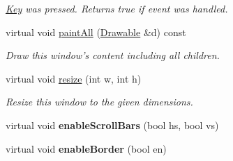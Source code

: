 \begin{DoxyCompactItemize}
\begin{DoxyCompactList}\small\item\em \hyperlink{classGUI_1_1Key}{Key} was pressed. Returns true if event was handled. \end{DoxyCompactList}\item 
\hypertarget{classGUI_1_1WindowInWindow_a997195eb95899394daa7c8806dfa6cf7}{virtual void \hyperlink{classGUI_1_1WindowInWindow_a997195eb95899394daa7c8806dfa6cf7}{paint\-All} (\hyperlink{classGUI_1_1Drawable}{Drawable} \&d) const }\label{classGUI_1_1WindowInWindow_a997195eb95899394daa7c8806dfa6cf7}

\begin{DoxyCompactList}\small\item\em Draw this window's content including all children. \end{DoxyCompactList}\item 
virtual void \hyperlink{classGUI_1_1WindowInWindow_a6ee682fe17ece1500d4b150b627efe48}{resize} (int w, int h)
\begin{DoxyCompactList}\small\item\em Resize this window to the given dimensions. \end{DoxyCompactList}\item 
\hypertarget{classGUI_1_1WindowInWindow_ae577d55445b2570da3755ae6912c66e0}{virtual void {\bfseries enable\-Scroll\-Bars} (bool hs, bool vs)}\label{classGUI_1_1WindowInWindow_ae577d55445b2570da3755ae6912c66e0}

\item 
\hypertarget{classGUI_1_1WindowInWindow_ae001aea9ade5258b7ac0d4df8c5b380c}{virtual void {\bfseries enable\-Border} (bool en)}\label{classGUI_1_1WindowInWindow_ae001aea9ade5258b7ac0d4df8c5b380c}

\end{DoxyCompactItemize}
